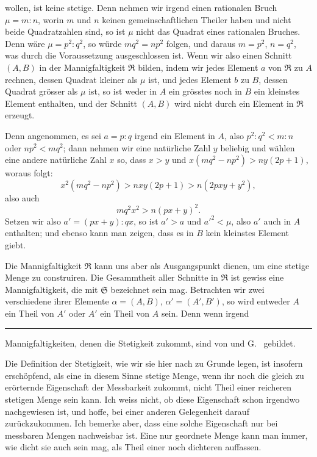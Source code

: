 wollen, ist keine stetige. Denn nehmen wir irgend einen rationalen
Bruch $\mu=m:n$, worin $m$ und $n$ keinen gemeinschaftlichen Theiler
haben und nicht beide Quadratzahlen sind, so ist $\mu$ nicht das
Quadrat eines rationalen Bruches. Denn wäre $\mu=p^2:q^2$, so würde
$mq^2=np^2$ folgen, und daraus $m=p^2$, $n=q^2$, was durch die
Voraussetzung ausgeschlossen ist. Wenn wir also einen Schnitt $(A,B)$
in der Mannigfaltigkeit $\mathfrak R$ bilden, indem wir jedes Element
$a$ von $\mathfrak R$ zu $A$ rechnen, dessen Quadrat kleiner als
$\mu$ ist, und jedes Element $b$ zu $B$, dessen Quadrat grösser als
$\mu$ ist, so ist weder in $A$ ein grösstes noch in $B$ ein kleinstes
Element enthalten, und der Schnitt $(A,B)$ wird nicht durch ein
Element in $\mathfrak R$ erzeugt.

Denn angenommen, es sei $a=p:q$ irgend ein Element in $A$, also
$p^2:q^2<m:n$ oder $np^2<mq^2$; dann nehmen wir eine natürliche Zahl
$y$ beliebig und wählen eine andere natürliche Zahl $x$ so, dass
$x>y$ und $x(mq^2-np^2)>ny(2p+1)$, woraus folgt:
\[
 x^2(mq^2-np^2)>nxy(2p+1)>n(2pxy+y^2),
\]
also auch
\[
 mq^2x^2>n(px+y)^2.
\]
Setzen wir also $a'=(px+y):qx$, so ist $a'>a$ und $a'^2<\mu$,
also $a'$ auch in $A$ enthalten; und ebenso kann man zeigen, dass es
in $B$ kein kleinstes Element giebt.

Die Mannigfaltigkeit $\mathfrak R$ kann uns aber als Ausgangspunkt
dienen, um eine stetige Menge zu construiren. Die Gesammtheit aller
Schnitte in $\mathfrak R$ ist gewiss eine Mannigfaltigkeit, die mit
$\mathfrak S$ bezeichnet sein mag. Betrachten wir zwei verschiedene
ihrer Elemente $\alpha=(A,B)$, $\alpha'=(A',B')$, so wird entweder
$A$ ein Theil von $A'$ oder $A'$ ein Theil von $A$ sein. Denn wenn
irgend

\par\vfill
\noindent\rule{0.22\linewidth}{0.4pt}

{\footnotesize\noindent
Mannigfaltigkeiten, denen die Stetigkeit zukommt, sind von
 und G.\  gebildet.

Die Definition der Stetigkeit, wie wir sie hier nach
 zu Grunde legen, ist insofern erschöpfend, als
eine in diesem Sinne stetige Menge, wenn ihr noch die gleich zu
erörternde Eigenschaft der Messbarkeit zukommt, nicht Theil einer
reicheren stetigen Menge sein kann. Ich weiss nicht, ob diese
Eigenschaft schon irgendwo nachgewiesen ist, und hoffe, bei einer
anderen Gelegenheit darauf zurückzukommen. Ich bemerke aber, dass eine
solche Eigenschaft nur bei messbaren Mengen nachweisbar ist. Eine nur
geordnete Menge kann man immer, wie dicht sie auch sein mag, als Theil
einer noch dichteren auffassen.}

